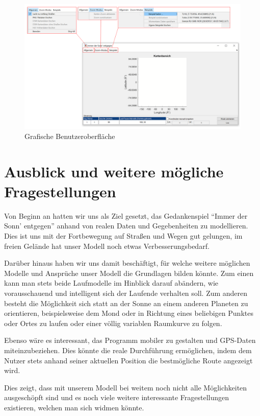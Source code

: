 \documentclass[
    paper=a4,
    DIV14,
    fontsize=12pt,
    pagesize=pdftex,
    toc=bibliographynumbered
]{scrartcl}
\numberwithin{figure}{section}
\numberwithin{equation}{section}
\numberwithin{table}{section}
\begin{document}
\begin{figure}[htb]
    \centering
    \includegraphics[width=1\textwidth]{images/gui.png}
    \caption{Grafische Benutzeroberfläche}
    \label{fig:GUI}
\end{figure}

\section{Ausblick und weitere mögliche Fragestellungen}

Von Beginn an hatten wir uns als Ziel gesetzt, das Gedankenspiel \enquote{Immer der Sonn'
entgegen} anhand von realen Daten und Gegebenheiten zu modellieren. Dies ist uns
mit der Fortbewegung auf Straßen und Wegen gut gelungen, im freien Gelände hat unser
Modell noch etwas Verbesserungsbedarf.

Darüber hinaus haben wir uns damit beschäftigt, für welche weitere möglichen Modelle und
Ansprüche unser Modell die Grundlagen bilden könnte. Zum einen kann man stets beide
Laufmodelle im Hinblick darauf abändern, wie vorausschauend und intelligent sich der
Laufende verhalten soll. Zum anderen besteht die Möglichkeit sich statt an der Sonne an
einem anderen Planeten zu orientieren, beispielsweise dem Mond oder in Richtung eines
beliebigen Punktes oder Ortes zu laufen oder einer völlig variablen Raumkurve zu folgen.

Ebenso wäre es interessant, das Programm mobiler zu gestalten und GPS-Daten
miteinzubeziehen. Dies könnte die reale Durchführung ermöglichen, indem dem Nutzer stets
anhand seiner aktuellen Position die bestmögliche Route angezeigt wird.

Dies zeigt, dass mit unserem Modell bei weitem noch nicht alle Möglichkeiten ausgeschöpft
sind und es noch viele weitere interessante Fragestellungen existieren, welchen man sich
widmen könnte.
\end{document}
